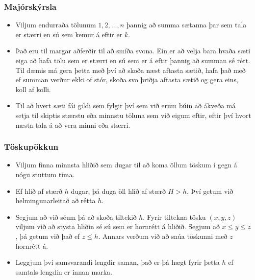 \documentclass{beamer}
\begin{document}
\begin{frame}
\frametitle{Majórskýrsla}

\begin{itemize}

\item Viljum endurraða tölunum $1, 2, \dots, n$ þannig að summa sætanna þar sem tala er stærri en sú sem kemur á eftir er $k$.

\vspace*{0.25cm}

\item Það eru til margar aðferðir til að smíða svona. Ein er að velja bara hvaða sæti eiga að hafa tölu sem er stærri en sú sem er
á eftir þannig að summan sé rétt. Til dæmis má gera þetta með því að skoða næst aftasta sætið, hafa það með ef summan verður ekki of stór, skoða svo þriðja aftasta sætið og gera eins, koll af kolli.

\vspace*{0.25cm}

\item Til að hvert sæti fái gildi sem fylgir því sem við erum búin að ákveða má setja til skiptis stærstu eða minnstu töluna sem við eigum eftir, eftir því hvort næsta tala á að vera minni eða stærri.

\end{itemize}

\end{frame}

\begin{frame}
\frametitle{Töskupökkun}

\begin{itemize}

\item Viljum finna minnsta hliðið sem dugar til að koma öllum töskum í gegn á nógu stuttum tíma.

\vspace*{0.25cm}

\item Ef hlið af stærð $h$ dugar, þá duga öll hlið af stærð $H > h$. Því getum við helmingunarleitað að rétta $h$.

\vspace*{0.25cm}

\item Segjum að við séum þá að skoða tiltekið $h$. Fyrir tiltekna tösku $(x, y, z)$ viljum við að stysta hliðin sé sú sem er hornrétt á hliðið. Segjum að $x \leq y \leq z$, þá getum við það ef $z \leq h$. Annars verðum við að snúa töskunni með $z$ hornrétt á. 

\vspace*{0.25cm}

\item Leggjum því samsvarandi lengdir saman, það er þá hægt fyrir þetta $h$ ef samtals lengdin er innan marka.

\end{itemize}

\end{frame}
\end{document}
